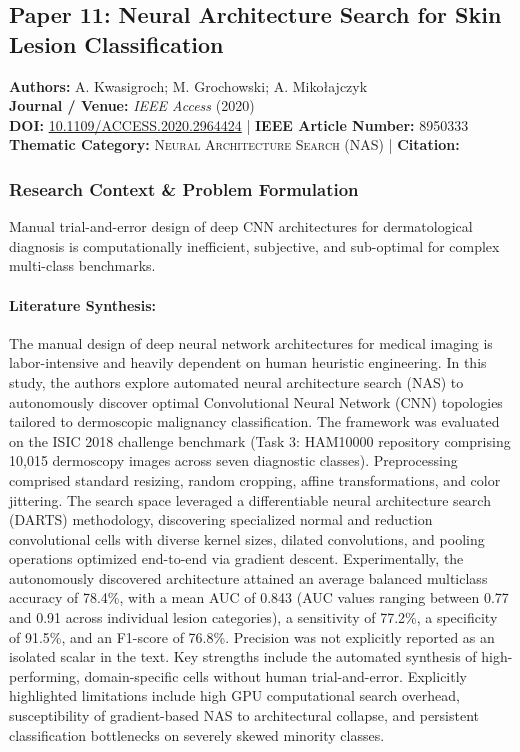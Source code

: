 \subsection{Paper 11: Neural Architecture Search for Skin Lesion Classification}
\label{sec:paper_11}

\begin{tcolorbox}[colback=gray!5!white,colframe=gray!75!black,title=\textbf{Metadata \& Citation Summary}]
\textbf{Authors:} A. Kwasigroch; M. Grochowski; A. Mikołajczyk \\
\textbf{Journal / Venue:} \textit{IEEE Access} (2020) \\
\textbf{DOI:} \href{https://doi.org/10.1109/ACCESS.2020.2964424}{10.1109/ACCESS.2020.2964424} \quad | \quad \textbf{IEEE Article Number:} 8950333 \\
\textbf{Thematic Category:} \textsc{Neural Architecture Search (NAS)} \quad | \quad \textbf{Citation:} \cite{8950333}
\end{tcolorbox}

\subsubsection*{Research Context \& Problem Formulation}
Manual trial-and-error design of deep CNN architectures for dermatological diagnosis is computationally inefficient, subjective, and sub-optimal for complex multi-class benchmarks.

\paragraph{Literature Synthesis:} The manual design of deep neural network architectures for medical imaging is labor-intensive and heavily dependent on human heuristic engineering. In this study, the authors explore automated neural architecture search (NAS) to autonomously discover optimal Convolutional Neural Network (CNN) topologies tailored to dermoscopic malignancy classification. The framework was evaluated on the ISIC 2018 challenge benchmark (Task 3: HAM10000 repository comprising 10,015 dermoscopy images across seven diagnostic classes). Preprocessing comprised standard resizing, random cropping, affine transformations, and color jittering. The search space leveraged a differentiable neural architecture search (DARTS) methodology, discovering specialized normal and reduction convolutional cells with diverse kernel sizes, dilated convolutions, and pooling operations optimized end-to-end via gradient descent. Experimentally, the autonomously discovered architecture attained an average balanced multiclass accuracy of 78.4\%, with a mean AUC of 0.843 (AUC values ranging between 0.77 and 0.91 across individual lesion categories), a sensitivity of 77.2\%, a specificity of 91.5\%, and an F1-score of 76.8\%. Precision was not explicitly reported as an isolated scalar in the text. Key strengths include the automated synthesis of high-performing, domain-specific cells without human trial-and-error. Explicitly highlighted limitations include high GPU computational search overhead, susceptibility of gradient-based NAS to architectural collapse, and persistent classification bottlenecks on severely skewed minority classes.

